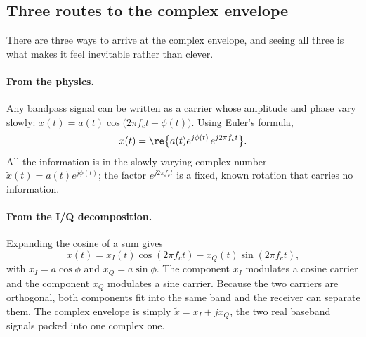 \subsection{Three routes to the complex envelope}

There are three ways to arrive at the complex envelope, and seeing all three is what makes it
feel inevitable rather than clever.

\paragraph{From the physics.} Any bandpass signal can be written as a carrier whose amplitude and
phase vary slowly: $x(t)=a(t)\cos\big(2\pi f_ct+\phi(t)\big)$. Using Euler's formula,
\begin{equation}
x(t)=\re\big\{a(t)e^{j\phi(t)}\,e^{j2\pi f_ct}\big\}.
\end{equation}
All the information is in the slowly varying complex number $\tilde x(t)=a(t)e^{j\phi(t)}$; the
factor $e^{j2\pi f_ct}$ is a fixed, known rotation that carries no information.


\paragraph{From the I/Q decomposition.} Expanding the cosine of a sum gives
\begin{equation}
x(t)=x_I(t)\cos(2\pi f_c t)-x_Q(t)\sin(2\pi f_c t),
\label{eq:ch02:iq}
\end{equation}
with $x_I=a\cos\phi$ and $x_Q=a\sin\phi$. The  component $x_I$ modulates a cosine
carrier and the  component $x_Q$ modulates a sine carrier. Because the two
carriers are orthogonal, both components fit into the same band and the receiver can separate them.
The complex envelope is simply $\tilde x=x_I+jx_Q$, the two real baseband signals packed into one
complex one.

